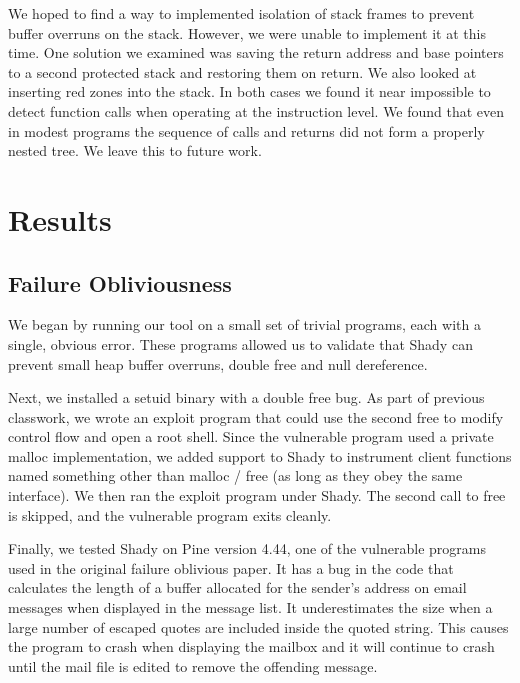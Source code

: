 \documentclass{article}
\begin{document}
We hoped to find a way to implemented isolation of stack frames to prevent buffer overruns on the stack.  However, we were unable to implement it at this time.  One solution we examined was saving the return address and base pointers to a second protected stack and restoring them on return.  We also looked at inserting red zones into the stack.  In both cases we found it near impossible to detect function calls when operating at the instruction level.  We found that even in modest programs the sequence of calls and returns did not form a properly nested tree.  We leave this to future work.


\section{Results} %
\label{sec:Results}

\subsection{Failure Obliviousness}

We began by running our tool on a small set of trivial programs, each with a single, obvious error. These programs allowed us to validate that Shady can prevent small heap buffer overruns, double free and null dereference.

Next, we installed a setuid binary with a double free bug. As part of previous classwork, we wrote an exploit program that could use the second free to modify control flow and open a root shell. Since the vulnerable program used a private malloc implementation, we added support to Shady to instrument client functions named something other than malloc / free (as long as they obey the same interface). We then ran the exploit program under Shady. The second call to free is skipped, and the vulnerable program exits cleanly.

Finally, we tested Shady on Pine version 4.44, one of the vulnerable programs used in the original failure oblivious paper. It has a bug in the code that calculates the length of a buffer allocated for the sender's address on email messages when displayed in the message list.  It underestimates the size when a large number of escaped quotes are included inside the quoted string.  This causes the program to crash when displaying the mailbox and it will continue to crash until the mail file is edited to remove the offending message.
\end{document}
